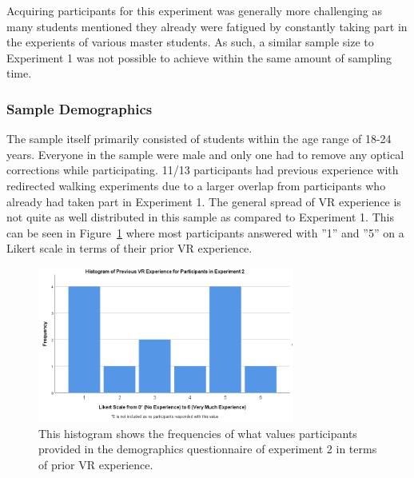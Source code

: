 Acquiring participants for this experiment was generally more challenging as many students mentioned they already were fatigued by constantly taking part in the experients of various master students. As such, a similar sample size to Experiment 1 was not possible to achieve within the same amount of sampling time. 

\subsubsection{Sample Demographics}
The sample itself primarily consisted of students within the age range of 18-24 years. Everyone in the sample were male and only one had to remove any optical corrections while participating. 11/13 participants had previous experience with redirected walking experiments due to a larger overlap from participants who already had taken part in Experiment 1. The general spread of VR experience is not quite as well distributed in this sample as compared to Experiment 1. This can be seen in Figure~\ref{fig:ex2PriorVRExperience} where most participants answered with ''1'' and ''5'' on a Likert scale in terms of their prior VR experience.

\begin{figure}[tbph]
    \centering
    \includegraphics[width=0.75\textwidth]{figures/graphs/PriorVRExperienceExperiment2.png}
    \caption[Histogram on Prior VR Experience of Participants in Experiment 2]{This histogram shows the frequencies of what values participants provided in the demographics questionnaire of experiment 2 in terms of prior VR experience.}
    \label{fig:ex2PriorVRExperience}
\end{figure}

